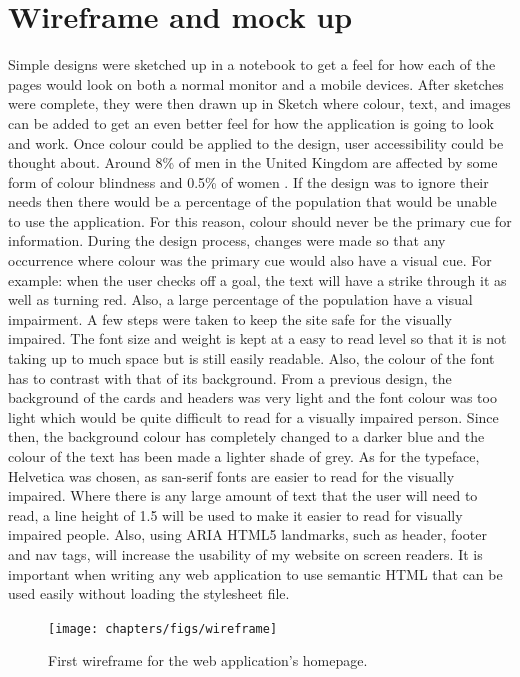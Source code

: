 \section{Wireframe and mock up}
Simple designs were sketched up in a notebook to get a feel for how each of the pages would look on both a normal monitor and a mobile devices. After sketches were complete, they were then drawn up in Sketch \citep{sketch:2013} where colour, text, and images can be added to get an even better feel for how the application is going to look and work. Once colour could be applied to the design, user accessibility could be thought about. Around 8\% of men in the United Kingdom are affected by some form of colour blindness and 0.5\% of women \citep{colourBlind}. If the design was to ignore their needs then there would be a percentage of the population that would be unable to use the application. For this reason, colour should never be the primary cue for information. During the design process, changes were made so that any occurrence where colour was the primary cue would also have a visual cue. For example: when the user checks off a goal, the text will have a strike through it as well as turning red. Also, a large percentage of the population have a visual impairment. A few steps were taken to keep the site safe for the visually impaired. The font size and weight is kept at a easy to read level so that it is not taking up to much space but is still easily readable. Also, the colour of the font has to contrast with that of its background. From a previous design, the background of the cards and headers was very light and the font colour was too light which would be quite difficult to read for a visually impaired person. Since then, the background colour has completely changed to a darker blue and the colour of the text has been made a lighter shade of grey. As for the typeface, Helvetica was chosen, as san-serif fonts are easier to read for the visually impaired. Where there is any large amount of text that the user will need to read, a line height of 1.5 will be used to make it easier to read for visually impaired people. Also, using ARIA HTML5  landmarks, such as header, footer and nav tags, will increase the usability of my website on screen readers. It is important when writing any web application to use semantic HTML  that can be used easily without loading the stylesheet file.\\

\begin{figure}[!ht]
\centering
\texttt{[image: chapters/figs/wireframe]}
\caption{First wireframe for the web application's homepage.}
\label{fig:erd}
\end{figure}

